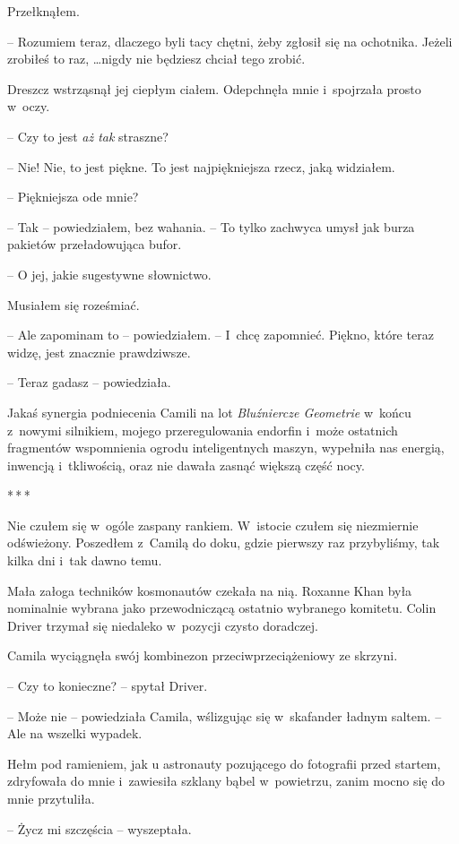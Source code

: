 \documentclass[oneside,polish,12pt,sfheadings]{mwbk}
\newcommand{\threeast}{\bigskip\par\centerline{*\,*\,*}\medskip\par}%
\begin{document}
Przełknąłem. 

-- Rozumiem teraz, dlaczego byli tacy chętni, żeby zgłosił
się na ochotnika. Jeżeli zrobiłeś to raz, \ldots nigdy nie będziesz chciał
tego zrobić.

Dreszcz wstrząsnął jej ciepłym ciałem. Odepchnęła mnie i~spojrzała
prosto w~oczy.

-- Czy to jest \emph{aż tak} straszne?

-- Nie! Nie, to jest piękne. To jest najpiękniejsza rzecz, jaką
widziałem.

-- Piękniejsza ode mnie?

-- Tak -- powiedziałem, bez wahania. -- To tylko zachwyca umysł jak burza
pakietów przeładowująca bufor.

-- O jej, jakie sugestywne słownictwo.

Musiałem się roześmiać.

-- Ale zapominam to -- powiedziałem. -- I~chcę zapomnieć. Piękno, które
teraz widzę, jest znacznie prawdziwsze.

-- Teraz gadasz -- powiedziała.

Jakaś synergia podniecenia Camili na lot \emph{Bluźniercze Geometrie} w~końcu z~nowymi silnikiem, mojego przeregulowania endorfin i~może
ostatnich fragmentów wspomnienia ogrodu inteligentnych maszyn, wypełniła
nas energią, inwencją i~tkliwością, oraz nie dawała zasnąć większą część
nocy.

\threeast

Nie czułem się w~ogóle zaspany rankiem. W~istocie czułem się niezmiernie
odświeżony. Poszedłem z~Camilą do doku, gdzie pierwszy raz przybyliśmy,
tak kilka dni i~tak dawno temu.

Mała załoga techników kosmonautów czekała na nią. Roxanne Khan była
nominalnie wybrana jako przewodniczącą ostatnio wybranego komitetu.
Colin Driver trzymał się niedaleko w~pozycji czysto doradczej.

Camila wyciągnęła swój kombinezon przeciwprzeciążeniowy ze skrzyni.

-- Czy to konieczne? -- spytał Driver.

-- Może nie -- powiedziała Camila, wślizgując się w~skafander ładnym
saltem. -- Ale na wszelki wypadek.

Hełm pod ramieniem, jak u astronauty pozującego do fotografii przed
startem, zdryfowała do mnie i~zawiesiła szklany bąbel w~powietrzu, zanim
mocno się do mnie przytuliła.

-- Życz mi szczęścia -- wyszeptała.
\end{document}
